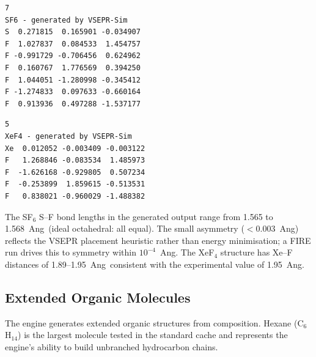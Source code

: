\documentclass[11pt,twoside]{article}
\def\AA{Ang}%
\begin{document}
\begin{minipage}[t]{0.46\textwidth}
\begin{lstlisting}[language={}, frame=single, basicstyle=\ttfamily\scriptsize, caption={\texttt{sf6\_optimized.xyz}}]
7
SF6 - generated by VSEPR-Sim
S  0.271815  0.165901 -0.034907
F  1.027837  0.084533  1.454757
F -0.991729 -0.706456  0.624962
F  0.160767  1.776569  0.394250
F  1.044051 -1.280998 -0.345412
F -1.274833  0.097633 -0.660164
F  0.913936  0.497288 -1.537177
\end{lstlisting}
\end{minipage}
\hfill
\begin{minipage}[t]{0.46\textwidth}
\begin{lstlisting}[language={}, frame=single, basicstyle=\ttfamily\scriptsize, caption={\texttt{xenon\_tetrafluoride.xyz}}]
5
XeF4 - generated by VSEPR-Sim
Xe  0.012052 -0.003409 -0.003122
F   1.268846 -0.083534  1.485973
F  -1.626168 -0.929805  0.507234
F  -0.253899  1.859615 -0.513531
F   0.838021 -0.960029 -1.488382
\end{lstlisting}
\end{minipage}

\vspace{0.5em}
The SF$_6$ S--F bond lengths in the generated output range from 1.565 to 1.568~\AA\ (ideal octahedral: all equal). The small asymmetry ($< 0.003$~\AA) reflects the VSEPR placement heuristic rather than energy minimisation; a FIRE run drives this to symmetry within $10^{-4}$~\AA. The XeF$_4$ structure has Xe--F distances of 1.89--1.95~\AA\ consistent with the experimental value of 1.95~\AA.

\subsection{Extended Organic Molecules}

The engine generates extended organic structures from composition. Hexane (C$_6$H$_{14}$) is the largest molecule tested in the standard cache and represents the engine's ability to build unbranched hydrocarbon chains.
\end{document}
